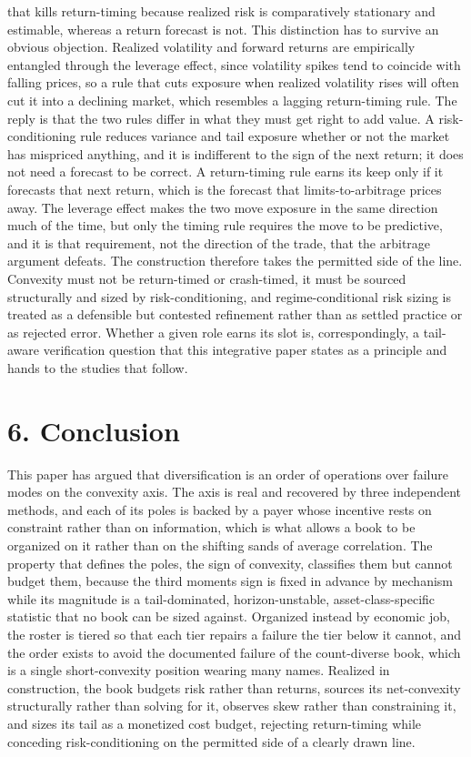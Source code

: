 \documentclass[12pt, a4paper]{article}
\begin{document}
that kills return-timing because realized risk is comparatively
stationary and estimable, whereas a return forecast is not. This
distinction has to survive an obvious objection. Realized volatility and
forward returns are empirically entangled through the leverage effect,
since volatility spikes tend to coincide with falling prices, so a rule
that cuts exposure when realized volatility rises will often cut it into
a declining market, which resembles a lagging return-timing rule. The
reply is that the two rules differ in what they must get right to add
value. A risk-conditioning rule reduces variance and tail exposure
whether or not the market has mispriced anything, and it is indifferent
to the sign of the next return; it does not need a forecast to be
correct. A return-timing rule earns its keep only if it forecasts that
next return, which is the forecast that limits-to-arbitrage prices away.
The leverage effect makes the two move exposure in the same direction
much of the time, but only the timing rule requires the move to be
predictive, and it is that requirement, not the direction of the trade,
that the arbitrage argument defeats. The construction therefore takes
the permitted side of the line. Convexity must not be return-timed or
crash-timed, it must be sourced structurally and sized by
risk-conditioning, and regime-conditional risk sizing is treated as a
defensible but contested refinement rather than as settled practice or
as rejected error. Whether a given role earns its slot is,
correspondingly, a tail-aware verification question that this
integrative paper states as a principle and hands to the studies that
follow.

\section*{6. Conclusion}\label{conclusion}

This paper has argued that diversification is an order of operations
over failure modes on the convexity axis. The axis is real and recovered
by three independent methods, and each of its poles is backed by a payer
whose incentive rests on constraint rather than on information, which is
what allows a book to be organized on it rather than on the shifting
sands of average correlation. The property that defines the poles, the
sign of convexity, classifies them but cannot budget them, because the
third moment\textquotesingle s sign is fixed in advance by mechanism
while its magnitude is a tail-dominated, horizon-unstable,
asset-class-specific statistic that no book can be sized against.
Organized instead by economic job, the roster is tiered so that each
tier repairs a failure the tier below it cannot, and the order exists to
avoid the documented failure of the count-diverse book, which is a
single short-convexity position wearing many names. Realized in
construction, the book budgets risk rather than returns, sources its
net-convexity structurally rather than solving for it, observes skew
rather than constraining it, and sizes its tail as a monetized cost
budget, rejecting return-timing while conceding risk-conditioning on the
permitted side of a clearly drawn line.
\end{document}
